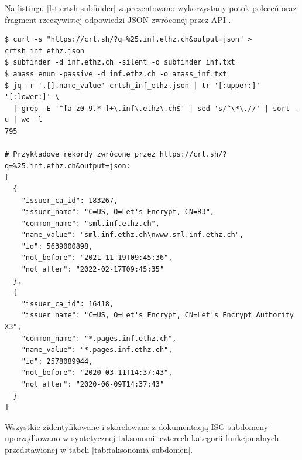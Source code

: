 {{Na listingu \ref{lst:crtsh-subfinder} zaprezentowano wykorzystany potok poleceń oraz fragment rzeczywistej odpowiedzi JSON zwróconej przez API .

\begin{lstlisting}[caption={Pasywna enumeracja subdomen za pomocą API crt.sh, subfinder i amass wraz z próbką JSON}, label={lst:crtsh-subfinder}]
$ curl -s "https://crt.sh/?q=%25.inf.ethz.ch&output=json" > crtsh_inf_ethz.json
$ subfinder -d inf.ethz.ch -silent -o subfinder_inf.txt
$ amass enum -passive -d inf.ethz.ch -o amass_inf.txt
$ jq -r '.[].name_value' crtsh_inf_ethz.json | tr '[:upper:]' '[:lower:]' \
  | grep -E '^[a-z0-9.*-]+\.inf\.ethz\.ch$' | sed 's/^\*\.//' | sort -u | wc -l
795

# Przykładowe rekordy zwrócone przez https://crt.sh/?q=%25.inf.ethz.ch&output=json:
[
  {
    "issuer_ca_id": 183267,
    "issuer_name": "C=US, O=Let's Encrypt, CN=R3",
    "common_name": "sml.inf.ethz.ch",
    "name_value": "sml.inf.ethz.ch\nwww.sml.inf.ethz.ch",
    "id": 5639000898,
    "not_before": "2021-11-19T09:45:36",
    "not_after": "2022-02-17T09:45:35"
  },
  {
    "issuer_ca_id": 16418,
    "issuer_name": "C=US, O=Let's Encrypt, CN=Let's Encrypt Authority X3",
    "common_name": "*.pages.inf.ethz.ch",
    "name_value": "*.pages.inf.ethz.ch",
    "id": 2578089944,
    "not_before": "2020-03-11T14:37:43",
    "not_after": "2020-06-09T14:37:43"
  }
]
\end{lstlisting}

Wszystkie zidentyfikowane i skorelowane z dokumentacją ISG subdomeny uporządkowano w syntetycznej taksonomii czterech kategorii funkcjonalnych przedstawionej w tabeli \ref{tab:taksonomia-subdomen}.

}}
